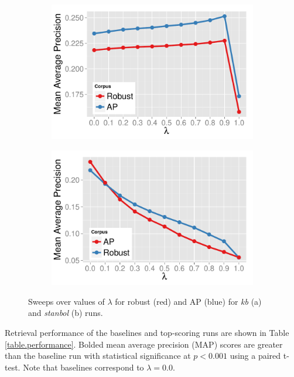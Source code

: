 \documentclass{sig-alternate}
\begin{document}
\begin{figure}
\centering
\begin{subfigure}{.5\columnwidth}
\centering
\includegraphics[width=\textwidth]{figures/sweep-ql.pdf}
\end{subfigure}%
\begin{subfigure}{.5\columnwidth}
\centering
\includegraphics[width=\textwidth]{figures/sweep-stanbol.pdf}
\end{subfigure}
\caption{Sweeps over values of $\lambda$ for robust (red) and AP (blue) for \textit{kb} (a) and \textit{stanbol} (b) runs.}
\label{figure.sweeps-ql}
\end{figure}

Retrieval performance of the baselines and top-scoring runs are shown in Table \ref{table.performance}. Bolded mean average precision (MAP) scores are greater than the baseline run with statistical significance at $p < 0.001$ using a paired t-test. Note that baselines correspond to $\lambda = 0.0$. 
\end{document}
